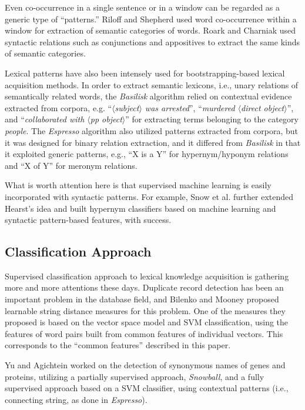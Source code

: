 \documentclass[english]{jnlp_1.4}
\begin{document}
Even co-occurrence in a single sentence or in a window can be regarded
as a generic type of ``patterns.'' Riloff and Shepherd
\cite{Riloff:97} used word co-occurrence within a window for
extraction of semantic categories of words. Roark and Charniak
\cite{Roark:98} used syntactic relations such as conjunctions and
appositives to extract the same kinds of semantic categories.

Lexical patterns have also been intensely used for bootstrapping-based
lexical acquisition methods. In order to extract semantic lexicons,
i.e., unary relations of semantically related words, the {\em
Basilisk} algorithm \cite{Thelen:02} relied on contextual evidence
extracted from corpora, e.g. ``\textit{$\langle$subject$\rangle$ was arrested}'',
``\textit{murdered $\langle$direct object$\rangle$}'', and ``\textit{collaborated with
$\langle$pp object$\rangle$}'' for extracting terms belonging to the category {\em
people}. The \textit{Espresso} algorithm \cite{Pantel:06} also utilized
patterns extracted from corpora, but it was designed for binary
relation extraction, and it differed from \textit{Basilisk} in that it
exploited generic patterns, e.g., ``X is a Y'' for hypernym/hyponym
relations and ``X of Y'' for meronym relations.

What is worth attention here is that supervised machine learning is
easily incorporated with syntactic patterns. For example, Snow et
al. \cite{Snow:04} further extended Hearst's idea and built hypernym
classifiers based on machine learning and syntactic pattern-based
features, with success.


\subsection{Classification Approach}

Supervised classification approach to lexical knowledge acquisition is
gathering more and more attentions these days. Duplicate record
detection has been an important problem in the database field, and
Bilenko and Mooney \cite{Bilenko:03} proposed learnable string
distance measures for this problem.  One of the measures they proposed
is based on the vector space model and SVM classification, using the
features of word pairs built from common features of individual
vectors. This corresponds to the ``common features'' described in this
paper.

Yu and Agichtein \cite{Yu:03} worked on the detection of synonymous
names of genes and proteins, utilizing a partially supervised
approach, \textit{Snowball}, and a fully supervised approach based on a
SVM classifier, using contextual patterns (i.e., connecting string, as
done in \textit{Espresso}).
\end{document}
